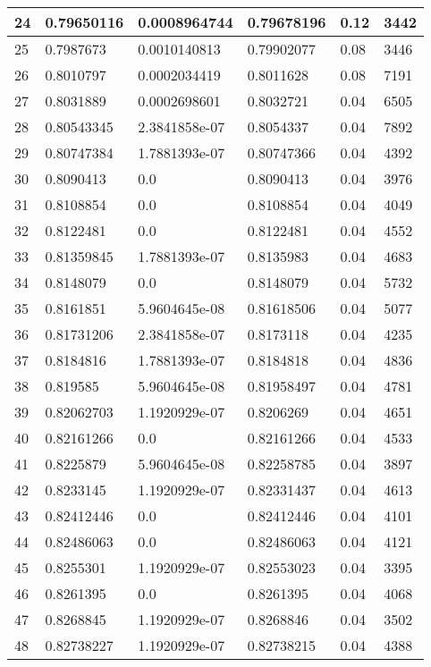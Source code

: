 \begin{longtable}{|l|l|l|l|l|l|}
24 & 0.79650116 & 0.0008964744 & 0.79678196 & 0.12 & 3442 \\ \hline 
25 & 0.7987673 & 0.0010140813 & 0.79902077 & 0.08 & 3446 \\ \hline 
26 & 0.8010797 & 0.0002034419 & 0.8011628 & 0.08 & 7191 \\ \hline 
27 & 0.8031889 & 0.0002698601 & 0.8032721 & 0.04 & 6505 \\ \hline 
28 & 0.80543345 & 2.3841858e-07 & 0.8054337 & 0.04 & 7892 \\ \hline 
29 & 0.80747384 & 1.7881393e-07 & 0.80747366 & 0.04 & 4392 \\ \hline 
30 & 0.8090413 & 0.0 & 0.8090413 & 0.04 & 3976 \\ \hline 
31 & 0.8108854 & 0.0 & 0.8108854 & 0.04 & 4049 \\ \hline 
32 & 0.8122481 & 0.0 & 0.8122481 & 0.04 & 4552 \\ \hline 
33 & 0.81359845 & 1.7881393e-07 & 0.8135983 & 0.04 & 4683 \\ \hline 
34 & 0.8148079 & 0.0 & 0.8148079 & 0.04 & 5732 \\ \hline 
35 & 0.8161851 & 5.9604645e-08 & 0.81618506 & 0.04 & 5077 \\ \hline 
36 & 0.81731206 & 2.3841858e-07 & 0.8173118 & 0.04 & 4235 \\ \hline 
37 & 0.8184816 & 1.7881393e-07 & 0.8184818 & 0.04 & 4836 \\ \hline 
38 & 0.819585 & 5.9604645e-08 & 0.81958497 & 0.04 & 4781 \\ \hline 
39 & 0.82062703 & 1.1920929e-07 & 0.8206269 & 0.04 & 4651 \\ \hline 
40 & 0.82161266 & 0.0 & 0.82161266 & 0.04 & 4533 \\ \hline 
41 & 0.8225879 & 5.9604645e-08 & 0.82258785 & 0.04 & 3897 \\ \hline 
42 & 0.8233145 & 1.1920929e-07 & 0.82331437 & 0.04 & 4613 \\ \hline 
43 & 0.82412446 & 0.0 & 0.82412446 & 0.04 & 4101 \\ \hline 
44 & 0.82486063 & 0.0 & 0.82486063 & 0.04 & 4121 \\ \hline 
45 & 0.8255301 & 1.1920929e-07 & 0.82553023 & 0.04 & 3395 \\ \hline 
46 & 0.8261395 & 0.0 & 0.8261395 & 0.04 & 4068 \\ \hline 
47 & 0.8268845 & 1.1920929e-07 & 0.8268846 & 0.04 & 3502 \\ \hline 
48 & 0.82738227 & 1.1920929e-07 & 0.82738215 & 0.04 & 4388 \\ \hline 

\end{longtable}
